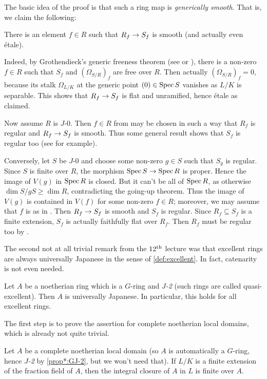 \begin{proof*}
	The basic idea of the proof is that such a ring map is \emph{generically smooth}. That is, we claim the following:
	\begin{alphanumerate}
		\item[\itememph{*}] There is an element $f\in R$ such that $R_f\morphism S_f$ is smooth (and actually even étale).
	\end{alphanumerate}
	Indeed, by Grothendieck's generic freeness theorem (see  or \cite[Proposition~A.2.1]{jacobians}), there is a non-zero $f\in R$ such that $S_f$ and $(\Omega_{S/R})_f$ are free over $R$. Then actually $(\Omega_{S/R})_f=0$, because its stalk $\Omega_{L/K}$ at the generic point $(0)\in \operatorname{Spec} S$ vanishes as $L/K$ is separable. This shows that $R_f\morphism S_f$ is flat and unramified, hence étale as claimed.
	
	Now assume $R$ is $J$-0. Then $f\in R$ from \itememph{*} may be chosen in such a way that $R_f$ is regular and $R_f\morphism S_f$ is smooth. Thus some general result shows that $S_f$ is regular too (see  for example).
	
	Conversely, let $S$ be $J$-0 and choose some non-zero $g\in S$ such that $S_g$ is regular. Since $S$ is finite over $R$, the morphism $\Spec S\morphism\Spec R$ is proper. Hence the image of $V(g)$ in $\operatorname{Spec} R$ is closed. But it can't be all of $\operatorname{Spec} R$, as otherwise $\dim S/gS\geq \dim R$, contradicting the going-up theorem. Thus the image of $V(g)$ is contained in $V(f)$ for some non-zero $f\in R$; moreover, we may assume that $f$ is as in \itememph{*}. Then $R_f\morphism S_f$ is smooth and $S_f$ is regular. Since $R_f\subseteq S_f$ is a finite extension, $S_f$ is actually faithfully flat over $R_f$. Then $R_f$ must be regular too by .
\end{proof*}
The second not at all trivial remark from the $12^{\text{th}}$ lecture was that excellent rings are always universally Japanese in the sense of \cref{def:excellent}. In fact, catenarity is not even needed.
\begin{prop*}\label{prop*:quasi-excellentUniversallyJapanese}
	Let $A$ be a noetherian ring which is a $G$-ring and \emph{$J$-2} (such rings are called quasi-excellent). Then $A$ is universally Japanese. In particular, this holds for all excellent rings.
\end{prop*}
The first step is to prove the assertion for complete noetherian local domains, which is already not quite trivial.
\begin{lem*}\label{lem*:completeUniversallyJapanese}
	Let $A$ be a complete noetherian local domain (so $A$ is automatically a $G$-ring, hence \emph{$J$-2} by \cref{prop*:GJ-2}, but we won't need that). If $L/K$ is a finite extension of the fraction field of $A$, then the integral closure of $A$ in $L$ is finite over $A$.
\end{lem*}
